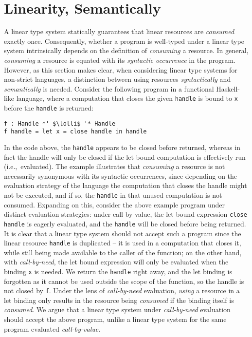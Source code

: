\documentclass[acmsmall,review]{acmart}
\newcommand{\lolli}{\multimap}
\begin{document}
\section{Linearity, Semantically\label{sec:linearity-semantically}}

A linear type system statically guarantees that linear resources are
\emph{consumed} exactly once. Consequently, whether a program is
well-typed under a linear type system intrinsically depends on the
definition of \emph{consuming} a resource.
In general, \emph{consuming} a resource is equated with its 
\emph{syntactic occurrence} in the program. However, as this section
makes clear, when considering linear type systems for non-strict
languages, a distinction between using
resources \emph{syntactically} and \emph{semantically} is needed.
%
Consider the following program in a functional Haskell-like language,
where a computation that closes the given \lstinline{handle} is bound to \lstinline{x} before the
\lstinline{handle} is returned:
%
\begin{lstlisting}
f : Handle *' $\lolli$ '* Handle
f handle = let x = close handle in handle
\end{lstlisting}
%

In the code above, the \lstinline{handle} appears to be closed before
returned, whereas in fact the handle will only be closed if the let bound
computation is effectively run (i.e.,~evaluated).
%
The example illustrates that \emph{consuming} a resource is not necessarily
synonymous with its syntactic occurrences, since depending on the evaluation strategy
of the language the computation that closes the handle might not be
executed, and if so, the \lstinline{handle} in that unused computation
is not consumed.
%
Expanding on this, consider the above example program under distinct
evaluation strategies: under call-by-value, %
the let
  bound expression \lstinline{close handle} is eagerly evaluated, and the \lstinline{handle} will be closed before being
returned. It is clear that a linear type system should not accept such a
program since the linear resource \lstinline{handle} is duplicated -- it is used in a
computation that closes it, while still being made available to the caller of
the function;
%
on the other hand, with \emph{call-by-need}, the let
bound expression will only be evaluated when the binding \lstinline{x} is needed. We return
the \lstinline{handle} right away, and the let binding is forgotten as it cannot be
used outside the scope of the function, so the handle is not closed by \lstinline{f}.
Under the lens of \emph{call-by-need} evaluation, \emph{using} a resource in a
let binding only results in the resource being \emph{consumed} if the binding
itself is \emph{consumed}. We argue that a linear type system under
\emph{call-by-need} evaluation should accept the above program, unlike a linear
type system for the same program evaluated \emph{call-by-value}.
\end{document}
